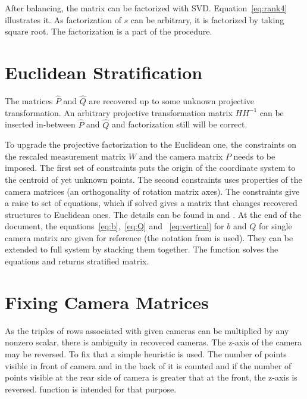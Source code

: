 \documentclass[12pt]{article}
\begin{document}
After balancing, the matrix can be factorized with SVD. Equation~\ref{eq:rank4}
illustrates it. As factorization of $s$ can be arbitrary, it is factorized by
taking square root. The factorization is a part of the
 procedure.



\section{Euclidean Stratification}

The matrices $\hat{P}$ and $\hat{Q}$ are recovered up to some unknown projective
transformation. An arbitrary projective transformation matrix $HH^{-1}$ can be inserted
in-between $\hat{P}$ and $\hat{Q}$ and factorization still will be correct.


To upgrade the projective factorization to the Euclidean one, the constraints on
the rescaled measurement matrix $W$ and the camera matrix $P$ needs to be
imposed. The first set of constraints puts the origin of the coordinate system
to the centroid of yet unknown points. The  second constraints uses properties
of the camera matrices (an orthogonality of rotation matrix   axes). The
constraints give a raise to set of equations, which if solved gives a matrix
that   changes recovered structures to Euclidean ones. The details can be found
in \cite{svoboda05}   and \cite{han00}. At the end of the document, the
equations~\ref{eq:b},~\ref{eq:Q} and  ~\ref{eq:vertical} for $b$ and $Q$ for
single camera matrix are given for reference (the   notation from
\cite{svoboda05} is used). They can be extended to full system by stacking them
together. The function  solves the equations
and returns   stratified matrix.

\section{Fixing Camera Matrices}

As the triples of rows associated with given cameras can be multiplied by any
nonzero scalar, there is ambiguity in recovered cameras. The z-axis of the
camera may be reversed. To fix that a simple heuristic is used. The number of
points visible in front of camera and in the back of it is counted and if the
number of points visible at the rear side of camera is greater that at  the
front, the z-axis is reversed.  function is
intended for  that purpose.
\end{document}
